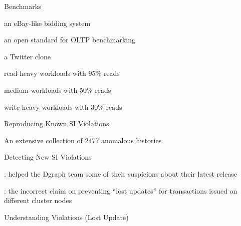 \begin{frame}{Benchmarks}
	\begin{center}
		\begin{description}[GeneralRW:]
			\setlength{\itemsep}{10pt}
			\item[RuBiS:] an eBay-like bidding system
			\item[TPC-C:] an open standard for OLTP benchmarking
			\item[C-Twitter:] a Twitter clone
			\vspace{10pt}
			\item[GeneralRH:] read-heavy workloads with $95\%$ reads
			\item[GeneralRW:] medium workloads with $50\%$ reads
			\item[GeneralWH:] write-heavy workloads with $30\%$ reads
		\end{description}
	\end{center}
\end{frame}

\begin{frame}{Reproducing Known SI Violations}
	\begin{center}
		{}
		\vspace{0.80cm}

		An extensive collection of 2477 anomalous histories \\[2pt]
	\end{center}
\end{frame}

\begin{frame}{Detecting New SI Violations}
	\begin{center}
		: helped the Dgraph team  some of their suspicions
		  about their latest release

		\vspace{0.50cm}
		{}
		\vspace{0.50cm}

		:  the incorrect claim on preventing ``lost updates''
		  for transactions issued on different cluster nodes
	\end{center}
\end{frame}

\begin{frame}{Understanding Violations (Lost Update)}
	\begin{center}
		
	\end{center}
\end{frame}

